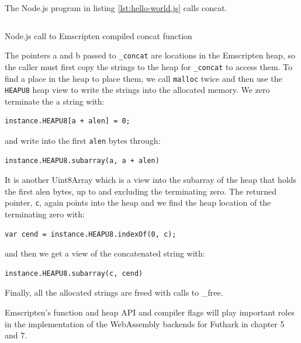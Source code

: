 \documentclass[11pt]{book}
\begin{document}
The Node.js program in listing \ref{lst:hello-world.js} calls concat.
\begin{listing}[H] 
\inputminted[fontsize=\small,baselinestretch=0.5,linenos]{C}{code/examples/emcc/hello-world.js}
\caption{Node.js call to Emscripten compiled concat function }
\label{lst:hello-world.js}    
\end{listing} 

The pointers a and b passed to \texttt{\_concat} are locations in the Emscripten heap, so the caller must first copy the strings to the heap for \texttt{\_concat} to access them. To find a place in the heap to place them, we call \texttt{malloc} twice and then use the \texttt{HEAPU8} heap view to write the strings into the allocated memory.
We zero terminate the a string with:
\begin{verbatim}
instance.HEAPU8[a + alen] = 0;
\end{verbatim}
and write into the first \texttt{alen} bytes through:
\begin{verbatim}
instance.HEAPU8.subarray(a, a + alen)
\end{verbatim}
It is another Uint8Array which is a view into the subarray of the heap that holds the first alen bytes, up to and excluding the terminating zero. 
The returned pointer, \texttt{c}, again points into the heap and we find the heap location of the terminating zero with:
\begin{verbatim}
var cend = instance.HEAPU8.indexOf(0, c);
\end{verbatim}
and then we get a view of the concatenated string with:
\begin{verbatim}
instance.HEAPU8.subarray(c, cend)
\end{verbatim}
Finally, all the allocated strings are freed with calls to \_free.


Emscripten's function and heap API and compiler flags will play important roles in the implementation of the WebAssembly backends for Futhark in chapter 5 and 7.




\end{document}
